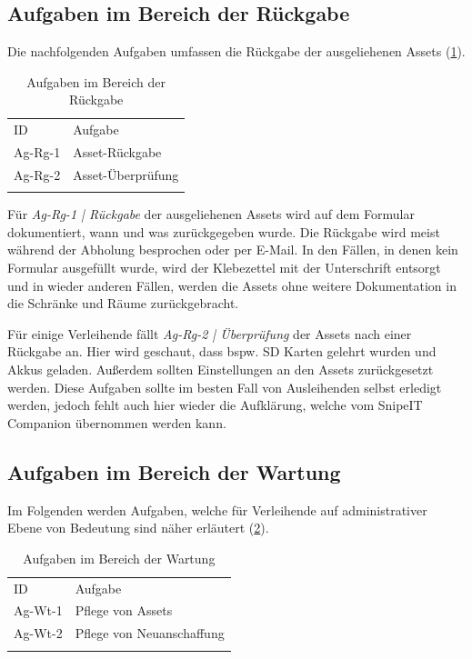 \subsection{Aufgaben im Bereich der Rückgabe}
Die nachfolgenden Aufgaben umfassen die Rückgabe der ausgeliehenen Assets (\ref{table:Ag-Rg}).
\begin{table}[h]
        \centering
        \caption{Aufgaben im Bereich der Rückgabe}
        \begin{tabular}{ll}
                \arrayrulecolor{maincolor}\hline
                \sffamily\color{maincolor}ID & \sffamily\color{maincolor}Aufgabe \\
                \arrayrulecolor{maincolor}\hline
                Ag-Rg-1                      & Asset-Rückgabe                    \\
                Ag-Rg-2                      & Asset-Überprüfung                 \\
                \arrayrulecolor{maincolor}\hline
        \end{tabular}
        \label{table:Ag-Rg}
\end{table}

Für \textit{Ag-Rg-1 | Rückgabe} der ausgeliehenen Assets wird auf dem Formular dokumentiert, wann und was
zurückgegeben wurde. Die Rückgabe wird meist während der Abholung besprochen oder per E-Mail. In den
Fällen, in denen kein Formular ausgefüllt wurde, wird der Klebezettel mit der Unterschrift entsorgt
und in wieder anderen Fällen, werden die Assets ohne weitere Dokumentation in die Schränke und Räume
zurückgebracht.

Für einige Verleihende fällt \textit{Ag-Rg-2 | Überprüfung} der Assets nach einer Rückgabe an. Hier
wird geschaut, dass bspw. SD Karten gelehrt wurden und Akkus geladen. Außerdem sollten Einstellungen
an den Assets zurückgesetzt werden. Diese Aufgaben sollte im besten Fall von Ausleihenden selbst
erledigt werden, jedoch fehlt auch hier wieder die Aufklärung, welche vom SnipeIT Companion
übernommen werden kann.
\subsection{Aufgaben im Bereich der Wartung}
\label{subsec:wartung}
Im Folgenden werden Aufgaben, welche für Verleihende auf administrativer Ebene von Bedeutung sind
näher erläutert (\ref{table:Ag-Wt}).

\begin{table}[h]
        \centering
        \caption{Aufgaben im Bereich der Wartung}
        \begin{tabular}{ll}
                \arrayrulecolor{maincolor}\hline
                \sffamily\color{maincolor}ID & \sffamily\color{maincolor}Aufgabe \\
                \arrayrulecolor{maincolor}\hline
                Ag-Wt-1                      & Pflege von Assets                 \\
                Ag-Wt-2                      & Pflege von Neuanschaffung         \\
                \arrayrulecolor{maincolor}\hline
        \end{tabular}
        \label{table:Ag-Wt}
\end{table}

